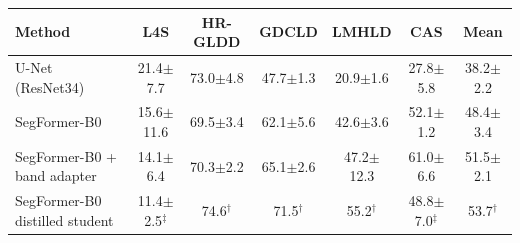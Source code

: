 \begin{tabular}{lcccccc}
\toprule
Method & L4S & HR-GLDD & GDCLD & LMHLD & CAS & Mean \\
\midrule
U-Net (ResNet34) & 21.4$\pm$7.7 & 73.0$\pm$4.8 & 47.7$\pm$1.3 & 20.9$\pm$1.6 & 27.8$\pm$5.8 & 38.2$\pm$2.2 \\
SegFormer-B0 & 15.6$\pm$11.6 & 69.5$\pm$3.4 & 62.1$\pm$5.6 & 42.6$\pm$3.6 & 52.1$\pm$1.2 & 48.4$\pm$3.4 \\
SegFormer-B0 + band adapter & 14.1$\pm$6.4 & 70.3$\pm$2.2 & 65.1$\pm$2.6 & 47.2$\pm$12.3 & 61.0$\pm$6.6 & 51.5$\pm$2.1 \\
SegFormer-B0 distilled student & 11.4$\pm$2.5$^\ddagger$ & 74.6$^\dagger$ & 71.5$^\dagger$ & 55.2$^\dagger$ & 48.8$\pm$7.0$^\ddagger$ & 53.7$^\dagger$ \\
\bottomrule
\end{tabular}
